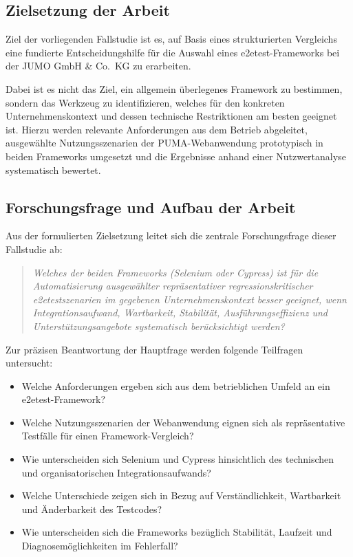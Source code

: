 \subsection{Zielsetzung der Arbeit}
Ziel der vorliegenden Fallstudie ist es, auf Basis eines strukturierten Vergleichs eine fundierte Entscheidungshilfe für die Auswahl eines \gls{e2etest}-Frameworks bei der JUMO GmbH \& Co.\ KG zu erarbeiten. 

Dabei ist es nicht das Ziel, ein allgemein überlegenes Framework zu bestimmen, sondern das Werkzeug zu identifizieren, welches für den konkreten Unternehmenskontext und dessen technische Restriktionen am besten geeignet ist. Hierzu werden relevante Anforderungen aus dem Betrieb abgeleitet, ausgewählte Nutzungsszenarien der \glqq PUMA\grqq-Webanwendung prototypisch in beiden Frameworks umgesetzt und die Ergebnisse anhand einer Nutzwertanalyse systematisch bewertet.

\subsection{Forschungsfrage und Aufbau der Arbeit}
Aus der formulierten Zielsetzung leitet sich die zentrale Forschungsfrage dieser Fallstudie ab:

\begin{quote}
\textit{Welches der beiden Frameworks (Selenium oder Cypress) ist für die Automatisierung ausgewählter repräsentativer regressionskritischer \gls{e2etests}zenarien im gegebenen Unternehmenskontext besser geeignet, wenn Integrationsaufwand, Wartbarkeit, Stabilität, Ausführungseffizienz und Unterstützungsangebote systematisch berücksichtigt werden?}
\end{quote}

Zur präzisen Beantwortung der Hauptfrage werden folgende Teilfragen untersucht:
\begin{itemize}
    \item Welche Anforderungen ergeben sich aus dem betrieblichen Umfeld an ein \gls{e2etest}-Framework?
    \item Welche Nutzungsszenarien der Webanwendung eignen sich als repräsentative Testfälle für einen Framework-Vergleich?
    \item Wie unterscheiden sich Selenium und Cypress hinsichtlich des technischen und organisatorischen Integrationsaufwands?
    \item Welche Unterschiede zeigen sich in Bezug auf Verständlichkeit, Wartbarkeit und Änderbarkeit des Testcodes?
    \item Wie unterscheiden sich die Frameworks bezüglich Stabilität, Laufzeit und Diagnosemöglichkeiten im Fehlerfall?
\end{itemize}

